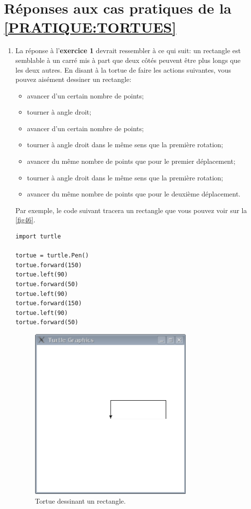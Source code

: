 \section{Réponses aux cas pratiques de la \autoref{PRATIQUE:TORTUES}\label{REPONSES:TORTUES}}
\begin{enumerate}
\item La réponse à l'\textbf{exercice 1} devrait ressembler à ce qui suit: un rectangle est semblable à un carré mis à part que deux côtés peuvent être plus longs que les deux autres. En disant à la tortue de faire les actions suivantes, vous pouvez aisément dessiner un rectangle:
\begin{itemize}
 \item avancer d'un certain nombre de points;
 \item tourner à angle droit;
 \item avancer d'un certain nombre de points;
 \item tourner à angle droit dans le même sens que la première rotation;
 \item avancer du même nombre de points que pour le premier déplacement;
 \item tourner à angle droit dans le même sens que la première rotation;
 \item avancer du même nombre de points que pour le deuxième déplacement.
\end{itemize}

Par exemple, le code suivant tracera un rectangle que vous pouvez voir sur la \autoref{fig46}.
\begin{Verbatim}[frame=single,rulecolor=\color{mbleu}, label=à taper]
import turtle

tortue = turtle.Pen()
tortue.forward(150)
tortue.left(90)
tortue.forward(50)
tortue.left(90)
tortue.forward(150)
tortue.left(90)
tortue.forward(50)
\end{Verbatim}


\begin{figure}[!ht]
\begin{center}
\includegraphics[width=82mm]{images/rectangletortue.eps}
\end{center}
\caption{Tortue dessinant un rectangle.}\label{fig46}
\end{figure}


\end{enumerate}

